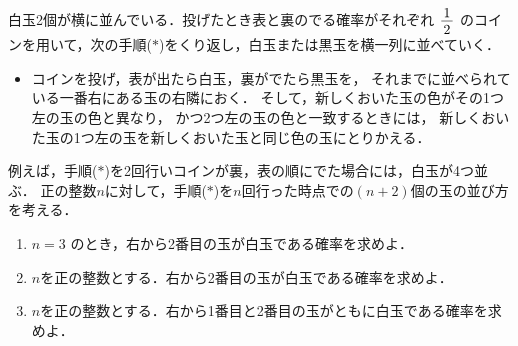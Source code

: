 ﻿\documentclass[../../../uem_mat_tok_q.tex]{subfiles}
\begin{document}
    白玉2個が横に並んでいる．投げたとき表と裏のでる確率がそれぞれ $\myfraca{1}{2}$ %
    のコインを用いて，次の手順($\ast$)をくり返し，白玉または黒玉を横一列に並べていく．

    \begin{itemize}[label={手順($\ast$)}, leftmargin=5\zw, labelsep=.7\zw, topsep=2pt]
        \item コインを投げ，表が出たら白玉，裏がでたら黒玉を，%
            それまでに並べられている一番右にある玉の右隣におく．%
            そして，新しくおいた玉の色がその1つ左の玉の色と異なり，%
            かつ2つ左の玉の色と一致するときには，%
            新しくおいた玉の1つ左の玉を新しくおいた玉と同じ色の玉にとりかえる．
    \end{itemize}
    例えば，手順($\ast$)を2回行いコインが裏，表の順にでた場合には，白玉が4つ並ぶ．%
    正の整数$n$に対して，手順($\ast$)を$n$回行った時点での$(n+2)$個の玉の並び方を考える．

    \begin{enumerate}
        \item $n=3$ のとき，右から2番目の玉が白玉である確率を求めよ．
        \item $n$を正の整数とする．右から2番目の玉が白玉である確率を求めよ．
        \item $n$を正の整数とする．右から1番目と2番目の玉がともに白玉である確率を求めよ．
    \end{enumerate}
\end{document}
